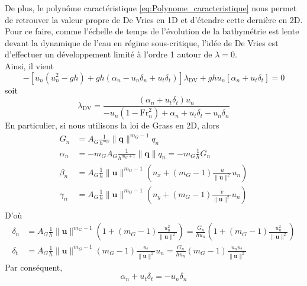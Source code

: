 \documentclass[11pt, a4paper, oneside]{report}
\begin{document}
De plus, le polynôme caractéristique \eqref{eq:Polynome_caracteristique} nous permet de retrouver la valeur propre de De Vries en 1D et d'étendre cette dernière en 2D. \\
Pour ce faire, comme l'échelle de temps de l'évolution de la bathymétrie est lente devant la dynamique de l'eau en régime sous-critique, l'idée de De Vries \cite{vries1965considerations} est d'effectuer un développement limité à l'ordre 1 autour de $\lambda = 0$. \\
Ainsi, il vient
\begin{equation}
    - \left[ u_n(u_n^2 - gh) + gh \left( \alpha_n - u_n \delta_n + u_t \delta_t \right) \right] \lambda_\text{DV} + gh u_n \left[ \alpha_n + u_t \delta_t \right] = 0
\end{equation}
soit
\begin{equation}
    \lambda_\text{DV} = \frac{\left( \alpha_n + u_t \delta_t \right) u_n}{-u_n \left( 1 - \text{Fr}_n^2 \right) + \alpha_n + u_t \delta_t - u_n \delta_n}
\end{equation}
En particulier, si nous utilisons la loi de Grass en 2D, alors
\begin{equation}
    \begin{aligned}
        G_n & = A_G \frac{1}{h^{m_G}} \| \bm{q} \|^{m_G - 1} q_n \\
        \alpha_n & = -m_G A_G \frac{1}{h^{m_G + 1}} \| \bm{q} \| q_n = - m_G \frac{1}{h} G_n \\
        \beta_n & = A_G \frac{1}{h} \| \bm{u} \|^{m_G - 1} \left( n_x + (m_G - 1) \frac{u}{\| \bm{u} \|^2} u_n \right) \\
        \gamma_n & = A_G \frac{1}{h} \| \bm{u} \|^{m_G - 1} \left( n_y + (m_G - 1) \frac{v}{\| \bm{u} \|^2} u_n \right) \\
    \end{aligned}
\end{equation}
D'où
\begin{equation}
    \begin{aligned}
        \delta_n & = A_G \frac{1}{h} \| \bm{u} \|^{m_G - 1} \left( 1 + (m_G - 1) \frac{u_n^2}{\| \bm{u} \|^2} \right) = \frac{G_n}{h u_n} \left( 1 + (m_G - 1) \frac{u_n^2}{\| \bm{u} \|^2} \right) \\
        \delta_t & = A_G \frac{1}{h} \| \bm{u} \|^{m_G - 1} (m_G - 1) \frac{u_t}{\| \bm{u} \|^2} u_n = \frac{G_n}{h u_n} (m_G - 1) \frac{u_n u_t}{\| \bm{u} \|^2}
    \end{aligned}
\end{equation}
Par conséquent,
\begin{equation}
    \alpha_n + u_t \delta_t = - u_n \delta_n
\end{equation}
\end{document}
